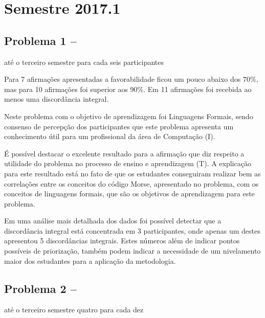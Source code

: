 \section{Semestre 2017.1}
\label{sec-sem-2017}


\subsection{Problema 1 -- \ProblemaG}
\label{sec-2017-p1}
{até o terceiro semestre}{ para cada seis participantes}

Para 7 afirmações apresentadas a favorabilidade ficou um pouco abaixo dos $70\%$, mas
para 10 afirmações foi superior aos $90\%$.
Em 11 afirmações foi recebida ao menos uma discordância integral.

Neste problema com o objetivo de aprendizagem foi Linguagens
Formais, sendo consenso de percepção dos participantes que
este problema apresenta um conhecimento útil para um profissional
da área de Computação (I).

É possível destacar o excelente resultado para a afirmação que diz respeito a
utilidade do problema no processo de ensino e aprendizagem (T).
A explicação para este resultado está no fato de que os estudantes
conseguiram realizar bem as correlações entre os conceitos
do código Morse, apresentado no problema, com os conceitos de
linguagens formais, que são os objetivos de aprendizagem para
este problema.

Em uma análise mais detalhada dos dados foi possível
detectar que a discordância integral está concentrada
em 3 participantes, onde apenas um destes apresentou
5 discordâncias integrais.
Estes números além de indicar pontos possíveis de
priorização, também podem indicar a necessidade
de um nivelamento maior dos estudantes para a aplicação
da metodologia.


\subsection{Problema 2 -- \ProblemaB}
{até o terceiro semestre}{ quatro para cada dez}

